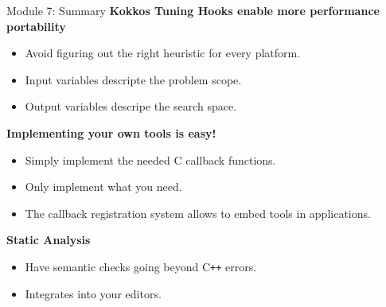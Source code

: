 \begin{frame}[fragile]{Module 7: Summary}
\textbf{Kokkos Tuning Hooks enable more performance portability}
\begin{itemize}
  \item Avoid figuring out the right heuristic for every platform.
  \item Input variables descripte the problem scope.
  \item Output variables descripe the search space.
\end{itemize}

\textbf{Implementing your own tools is easy!}
\begin{itemize}
  \item Simply implement the needed C callback functions.
  \item Only implement what you need.
  \item The callback registration system allows to embed tools in applications.
\end{itemize}

\textbf{Static Analysis}
\begin{itemize}
  \item Have semantic checks going beyond C\texttt{++} errors.
  \item Integrates into your editors.
\end{itemize}
\end{frame}




